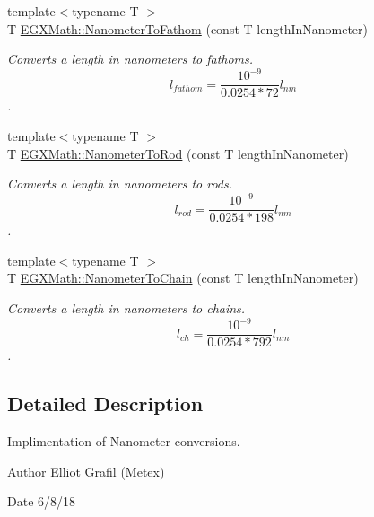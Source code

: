 \begin{DoxyCompactItemize}
{\footnotesize template$<$typename T $>$ }\\T \mbox{\hyperlink{group___e_g_x_math-_conversions-_length_conversions-_s_i-_nanometer-_nautical_ga934c7c5c17c283b51e1551b9731f05b6}{E\+G\+X\+Math\+::\+Nanometer\+To\+Fathom}} (const T length\+In\+Nanometer)
\begin{DoxyCompactList}\small\item\em Converts a length in nanometers to fathoms. \[ l_{fathom}= \frac{10^{-9}}{0.0254 * 72} l_{nm} \]. \end{DoxyCompactList}\item 
{\footnotesize template$<$typename T $>$ }\\T \mbox{\hyperlink{group___e_g_x_math-_conversions-_length_conversions-_s_i-_nanometer-_surveyors_ga4677e0e0b8662f3786f43cea2f76e8d9}{E\+G\+X\+Math\+::\+Nanometer\+To\+Rod}} (const T length\+In\+Nanometer)
\begin{DoxyCompactList}\small\item\em Converts a length in nanometers to rods. \[ l_{rod}= \frac{10^{-9}}{0.0254 * 198} l_{nm} \]. \end{DoxyCompactList}\item 
{\footnotesize template$<$typename T $>$ }\\T \mbox{\hyperlink{group___e_g_x_math-_conversions-_length_conversions-_s_i-_nanometer-_surveyors_ga8da91a669cbde463135b21d48ffbdedc}{E\+G\+X\+Math\+::\+Nanometer\+To\+Chain}} (const T length\+In\+Nanometer)
\begin{DoxyCompactList}\small\item\em Converts a length in nanometers to chains. \[ l_{ch}= \frac{10^{-9}}{0.0254 * 792} l_{nm} \]. \end{DoxyCompactList}\end{DoxyCompactItemize}


\subsection{Detailed Description}
Implimentation of Nanometer conversions. 

\begin{DoxyAuthor}{Author}
Elliot Grafil (Metex) 
\end{DoxyAuthor}
\begin{DoxyDate}{Date}
6/8/18 
\end{DoxyDate}
